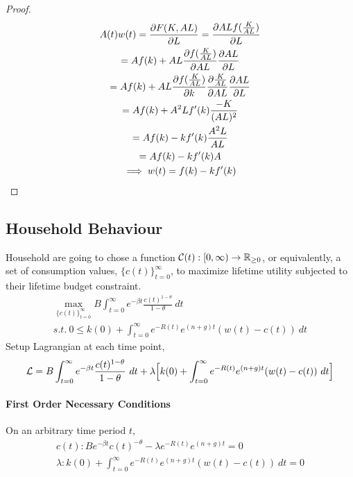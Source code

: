 \documentclass[11pt]{article}
\begin{document}
			\begin{proof}
                \begin{gather}
                    A(t)w(t) = \frac{\partial{F(K, AL)}}{\partial{L}} = \frac{\partial{AL f(\frac{K}{AL})}}{\partial{L}} \\
                    = Af(k) + AL \frac{\partial{f(\frac{K}{AL})}}{\partial{AL}} \frac{\partial{AL}}{\partial{L}} \\
                    = Af(k) + AL \frac{\partial{f(\frac{K}{AL})}}{\partial{k}} \frac{\partial{\frac{K}{AL}}}{\partial{AL}} \frac{\partial{AL}}{\partial{L}} \\
                    = Af(k) + A^2 L f'(k) \frac{-K}{(AL)^2} \\
                    = Af(k) - k f'(k) \frac{A^2 L}{AL} \\
                    = Af(k) - k f'(k) A \\
                    \implies w(t) = f(k) - k f'(k)
                \end{gather}
			\end{proof}
			
		\subsection{Household Behaviour}
			\par Household are going to chose a function $\mathcal{{C}}(t): [0, \infty) \to \mathbb{R}_{\geq 0}$, or equivalently, a set of consumption values, $\{c(t)\}_{t=0}^\infty$, to maximize lifetime utility subjected to their lifetime budget constraint.
			\begin{gather}
				\max_{\{c(t)\}_{t=0}^\infty} B \int_{t=0}^\infty e^{-\beta t} \frac{c(t)^{1-\theta}}{1-\theta}\ dt \\
				s.t.\ 0 \leq k(0) + \int_{t=0}^\infty {e^{-R(t)} e^{(n+g)t} (w(t) - c(t))\ dt}
			\end{gather}
			Setup Lagrangian at each time point,
			\begin{equation}
				\mathcal{{L}} = B \int_{t=0}^\infty e^{-\beta t} \frac{c(t)^{1-\theta}}{1-\theta}\ dt + \lambda \Big [ k(0) + \int_{t=0}^\infty {e^{-R(t)} e^{(n+g)t} (w(t) - c(t))\ dt} \Big ]
			\end{equation}
			\paragraph{First Order Necessary Conditions}
				On an arbitrary time period $t$,
				\begin{gather}
					c(t): B e^{-\beta t} c(t) ^{-\theta} - \lambda e^{-R(t)} e^{(n+g)t} = 0 \\
					\lambda: k(0) + \int_{t=0}^\infty {e^{-R(t)} e^{(n+g)t} (w(t) - c(t))\ dt} = 0
				\end{gather}
\end{document}

